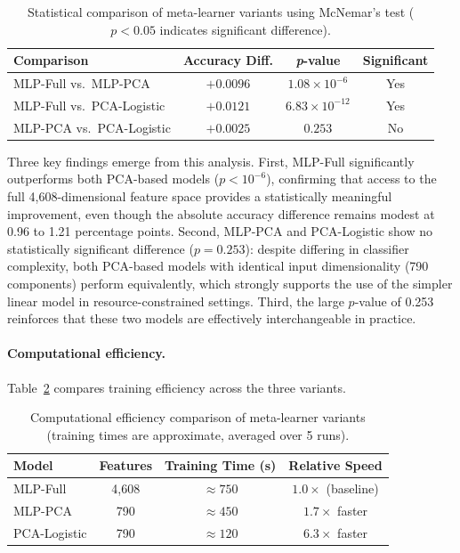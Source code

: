 \documentclass[pdflatex,sn-basic]{sn-jnl}
\begin{document}
\begin{table}[htbp]
\caption{Statistical comparison of meta-learner variants using McNemar's test ($p < 0.05$ indicates significant difference).}
\label{tab:results_statistical}
\begin{tabular*}{\textwidth}{@{\extracolsep\fill}lccc@{}}
\toprule
\textbf{Comparison} & \textbf{Accuracy Diff.} & \textbf{\textit{p}-value} & \textbf{Significant} \\
\midrule
MLP-Full vs.\ MLP-PCA      & $+0.0096$ & $1.08\times10^{-6}$  & Yes \\
MLP-Full vs.\ PCA-Logistic & $+0.0121$ & $6.83\times10^{-12}$ & Yes \\
MLP-PCA vs.\ PCA-Logistic  & $+0.0025$ & $0.253$              & No  \\
\bottomrule
\end{tabular*}
\end{table}

Three key findings emerge from this analysis. First, MLP-Full significantly outperforms both PCA-based models ($p < 10^{-6}$), confirming that access to the full 4,608-dimensional feature space provides a statistically meaningful improvement, even though the absolute accuracy difference remains modest at 0.96 to 1.21 percentage points. Second, MLP-PCA and PCA-Logistic show no statistically significant difference ($p = 0.253$): despite differing in classifier complexity, both PCA-based models with identical input dimensionality (790 components) perform equivalently, which strongly supports the use of the simpler linear model in resource-constrained settings. Third, the large $p$-value of 0.253 reinforces that these two models are effectively interchangeable in practice.

\paragraph{Computational efficiency.}
Table~\ref{tab:results_efficiency} compares training efficiency across the three variants.

\begin{table}[htbp]
\caption{Computational efficiency comparison of meta-learner variants (training times are approximate, averaged over 5 runs).}
\label{tab:results_efficiency}
\begin{tabular*}{\textwidth}{@{\extracolsep\fill}lccc@{}}
\toprule
\textbf{Model} & \textbf{Features} & \textbf{Training Time (s)} & \textbf{Relative Speed} \\
\midrule
MLP-Full    & 4,608 & $\approx 750$ & $1.0\times$ (baseline) \\
MLP-PCA     & 790   & $\approx 450$ & $1.7\times$ faster \\
PCA-Logistic& 790   & $\approx 120$ & $6.3\times$ faster \\
\bottomrule
\end{tabular*}
\end{table}
\end{document}
